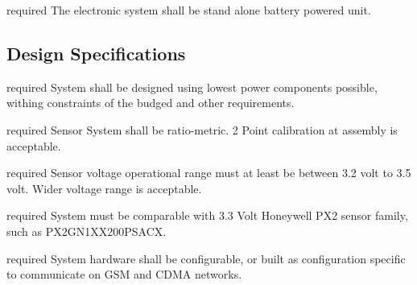 {\hdd}{required}  %
{
	The electronic system shall be stand alone battery powered unit.
}

\subsection{Design Specifications}

{\hrs}{required}  %
{
	System shall be designed using lowest power components possible, withing constraints of the budged and other requirements.
}

{\hdd}{required}  %
{
	Sensor System shall be ratio-metric.  2 Point calibration at assembly is acceptable.
}

{\hdd}{required}  %
{
	Sensor voltage operational range must at least be between 3.2 volt to 3.5 volt.  Wider voltage range is acceptable.
}

{\hdd}{required}  %
{
	System must be comparable with 3.3 Volt Honeywell PX2 sensor family, such as PX2GN1XX200PSACX.
}

{\hdd}{required}  %
{
	System hardware shall be configurable, or built as configuration specific to communicate on GSM and CDMA networks.
}
